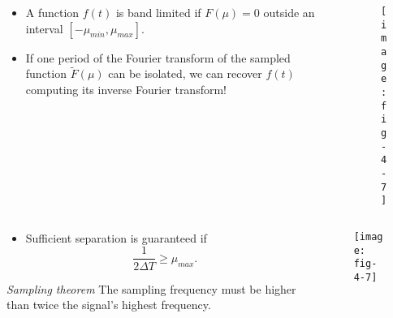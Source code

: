 
\begin{frame}
\begin{columns}
\begin{column}{.5\textwidth}
\begin{itemize}
\item A function $f(t)$ is band limited if $F(\mu) =0$ outside an interval $[-\mu_{min}, \mu_{max}]$.
\item If one period of the Fourier transform of the sampled function $\tilde{F}(\mu)$ can be isolated, we can recover $f(t)$ computing its inverse Fourier transform!
\end{itemize}
\end{column}
\begin{column}{.5\textwidth}
\begin{figure}
\centering
\texttt{[image: fig-4-7]}
\end{figure}
\end{column}
\end{columns}
\end{frame}


\begin{frame}
\begin{columns}
\begin{column}{.5\textwidth}
\begin{itemize}
\item Sufficient separation is guaranteed if
\begin{equation}
\dfrac{1}{2\Delta T} \geq \mu_{max}.
\end{equation}
\end{itemize}
\begin{block}{\textit{Sampling theorem}}
The sampling frequency must be higher than twice the signal's highest frequency.
\end{block}
\end{column}
\begin{column}{.5\textwidth}
\begin{figure}
\centering
\texttt{[image: fig-4-7]}
\end{figure}
\end{column}
\end{columns}
\end{frame}

